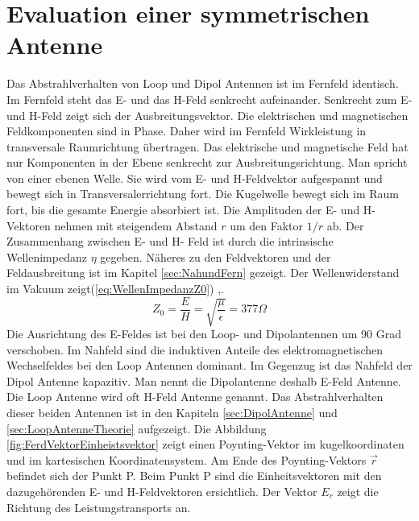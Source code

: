 
\newpage
\chapter{Evaluation einer symmetrischen Antenne}

Das Abstrahlverhalten von Loop und Dipol Antennen ist im Fernfeld identisch. Im Fernfeld steht das E- und das H-Feld senkrecht aufeinander. Senkrecht zum E- und H-Feld zeigt sich der Ausbreitungsvektor. Die elektrischen und
magnetischen Feldkomponenten sind in Phase. Daher wird im Fernfeld Wirkleistung in transversale Raumrichtung
übertragen. Das elektrische und magnetische Feld hat nur Komponenten in der Ebene senkrecht zur Ausbreitungsrichtung.
Man spricht von einer ebenen Welle. Sie wird vom E- und H-Feldvektor aufgespannt  und bewegt sich in
Transversalerrichtung fort. Die Kugelwelle bewegt sich im Raum fort, bis die gesamte Energie absorbiert ist. Die Amplituden der E- und H-Vektoren
nehmen mit steigendem Abstand $r$ um den Faktor $1/r$  ab. Der Zusammenhang zwischen E- und H- Feld ist
durch die intrinsische Wellenimpedanz $\eta$ gegeben. Näheres zu den Feldvektoren und der Feldausbreitung ist im Kapitel \ref{sec:NahundFern} gezeigt. Der Wellenwiderstand im Vakuum zeigt(\ref{eq:WellenImpedanzZ0}) \cite{Harrington-TimeHarmonic},\cite{Emant}.
\begin{equation}\label{eq:WellenImpedanzZ0}
Z_{0}=\dfrac{E}{H}=\sqrt{\dfrac{\mu}{\epsilon}}=377\Omega
\end{equation}
Die Ausrichtung des E-Feldes ist bei den Loop- und  Dipolantennen um 90 Grad verschoben. 
Im Nahfeld sind die induktiven Anteile des elektromagnetischen Wechselfeldes bei den Loop Antennen dominant. Im Gegenzug ist das Nahfeld der Dipol Antenne  kapazitiv. Man nennt die Dipolantenne deshalb E-Feld Antenne.  Die Loop Antenne wird oft H-Feld Antenne genannt. Das Abstrahlverhalten dieser beiden Antennen ist in den Kapiteln \ref{sec:DipolAntenne} und \ref{sec:LoopAntenneTheorie} aufgezeigt. Die Abbildung \ref{fig:FerdVektorEinheistsvektor} zeigt einen Poynting-Vektor im  kugelkoordinaten und im kartesischen Koordinatensystem. Am Ende des Poynting-Vektors $\vec{r}$  befindet sich der Punkt P. Beim Punkt P sind die Einheitsvektoren mit den dazugehörenden  E- und H-Feldvektoren ersichtlich\cite{Emant}. Der Vektor ${E}_r$ zeigt die Richtung des Leistungstransports an.\\



